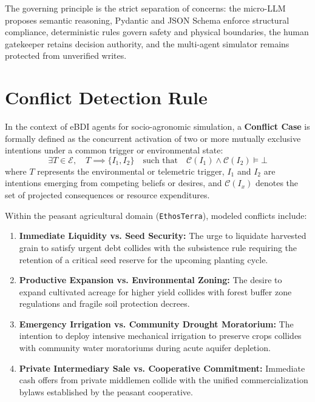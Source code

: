 \documentclass[11pt,a4paper]{article}
\begin{document}
The governing principle is the strict separation of concerns: the micro-LLM proposes semantic reasoning, Pydantic and JSON Schema enforce structural compliance, deterministic rules govern safety and physical boundaries, the human gatekeeper retains decision authority, and the multi-agent simulator remains protected from unverified writes.

\section{Conflict Detection Rule}
In the context of eBDI agents for socio-agronomic simulation, a \textbf{Conflict Case} is formally defined as the concurrent activation of two or more mutually exclusive intentions under a common trigger or environmental state:
\begin{equation}
    \exists T \in \mathcal{E}, \quad T \implies \{I_1, I_2\} \quad \text{such that} \quad \mathcal{C}(I_1) \land \mathcal{C}(I_2) \models \bot
\end{equation}
where $T$ represents the environmental or telemetric trigger, $I_1$ and $I_2$ are intentions emerging from competing beliefs or desires, and $\mathcal{C}(I_x)$ denotes the set of projected consequences or resource expenditures.

Within the peasant agricultural domain (\texttt{EthosTerra}), modeled conflicts include:
\begin{enumerate}[leftmargin=*]
    \item \textbf{Immediate Liquidity vs. Seed Security:} The urge to liquidate harvested grain to satisfy urgent debt collides with the subsistence rule requiring the retention of a critical seed reserve for the upcoming planting cycle.
    \item \textbf{Productive Expansion vs. Environmental Zoning:} The desire to expand cultivated acreage for higher yield collides with forest buffer zone regulations and fragile soil protection decrees.
    \item \textbf{Emergency Irrigation vs. Community Drought Moratorium:} The intention to deploy intensive mechanical irrigation to preserve crops collides with community water moratoriums during acute aquifer depletion.
    \item \textbf{Private Intermediary Sale vs. Cooperative Commitment:} Immediate cash offers from private middlemen collide with the unified commercialization bylaws established by the peasant cooperative.
\end{enumerate}
\end{document}
